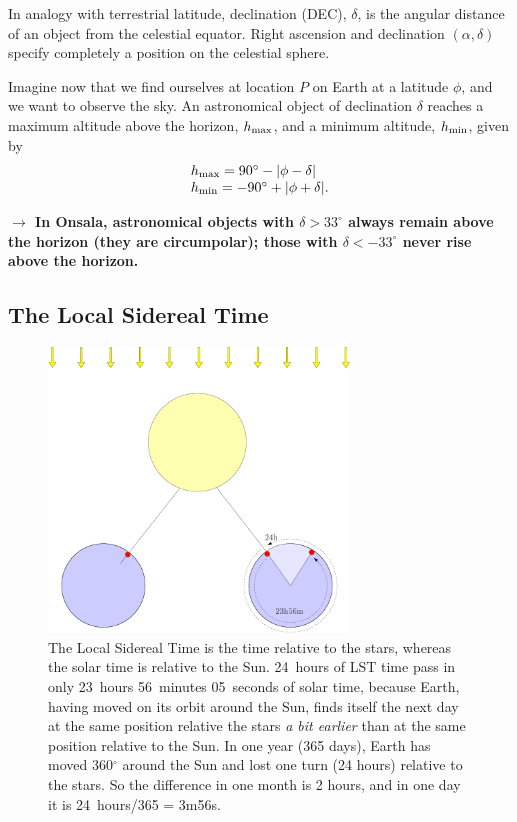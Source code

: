 In analogy with terrestrial latitude, declination (DEC), $\delta$, 
is the angular distance of an object from the celestial equator. 
Right ascension and declination $(\alpha,\delta)$ specify completely
a position on the celestial sphere. 

Imagine now that we find ourselves at location $P$ on Earth at a 
latitude $\phi$, and we want to observe the sky. 
An astronomical object
of declination $\delta$ reaches a maximum altitude above
the horizon, $h_{\rm max}$, and a minimum altitude, $h_{\rm min}$,
given by
\begin{equation}
\begin{array}{l}
h_{\rm max} = 90^\circ -|\phi-\delta| \\
h_{\rm min} = -90^\circ +|\phi+\delta|. 
\end{array}
\end{equation}

{\bf{$\rightarrow$ In Onsala, astronomical objects with $\delta > 33^\circ$
always remain above the horizon (they are circumpolar); those with $\delta <
-33^\circ$ never rise above the horizon.}}


\subsection{The Local Sidereal Time}

\begin{figure}[ht]
\begin{center}
 \includegraphics[width=8cm]{../figures/lst.pdf}
\end{center}
\caption{The Local Sidereal Time is the time relative to the stars, whereas the 
solar time is relative to the Sun. 24~hours of LST time pass in only 
23~hours 56~minutes 05~seconds of solar time, because Earth, having 
moved on its orbit around the Sun, finds itself the next day at the same position 
relative the stars {\em a bit earlier} than at the same position relative
to the Sun. 
In one year (365 days), Earth has moved 360$^\circ$ around the Sun and lost one 
turn (24 hours) relative to the stars. So the difference in one month is 2 hours, and in one day it is 24~hours/365 = 
3m56s.
}
\label{figlst}
\end{figure}

